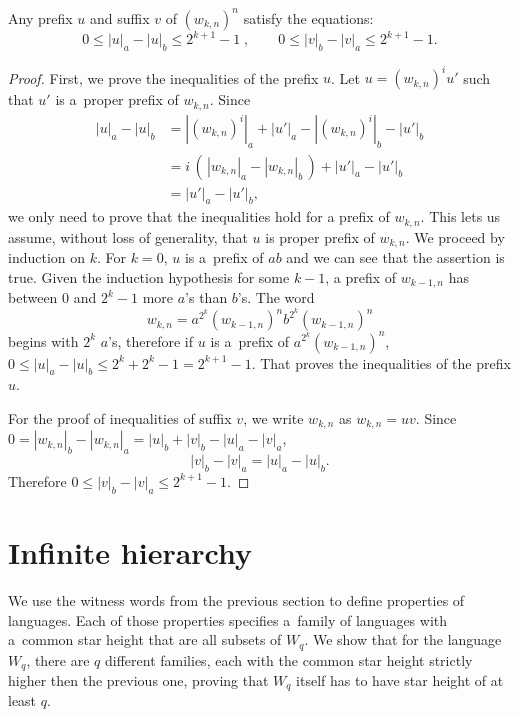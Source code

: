 \begin{lemma}\label{lm:witness_words_inequalities}
    Any prefix $u$ and suffix $v$ of ${(w_{k,n})}^n$ satisfy the equations:
    \[
        0 \leq |u|_a - |u|_b \leq 2^{k+1}-1 \; , \qquad 0 \leq |v|_b - |v|_a \leq 2^{k+1}-1.
    \]
\end{lemma}

\begin{proof}
    First, we prove the inequalities of the prefix $u$. Let $u = {(w_{k,n})}^i u'$ such that $u'$ is a~proper prefix of $w_{k,n}$. Since
    \begin{align*}
        |u|_a - |u|_b &= |{(w_{k,n})}^i|_a + |u'|_a - |{(w_{k,n})}^i|_b - |u'|_b \\
        &= i \, ( \, |w_{k,n}|_a - |w_{k,n}|_b \, ) + |u'|_a - |u'|_b \\
        &= |u'|_a - |u'|_b,
    \end{align*}
    we only need to prove that the inequalities hold for a prefix of $w_{k,n}$. This lets us assume, without loss of generality, that $u$ is proper prefix of $w_{k,n}$. We proceed by induction on $k$. For $k = 0$, $u$ is a~prefix of $ab$ and we can see that the assertion is true. Given the induction hypothesis for some $k - 1$, a prefix of $w_{k-1,n}$ has between $0$ and $2^k-1$ more $a$'s than $b$'s. The word
    \[
        w_{k,n} = a^{2^k} {(w_{k-1,n})}^n b^{2^k} {(w_{k-1,n})}^n
    \]
    begins with $2^k$ $a$'s, therefore if $u$ is a~prefix of $a^{2^k} {(w_{k-1,n})}^n$, $0 \leq |u|_a - |u|_b \leq 2^k+2^k-1 = 2^{k+1}-1$. That proves the inequalities of the prefix $u$.

    For the proof of inequalities of suffix $v$, we write $w_{k,n}$ as $w_{k,n} = uv$. Since $0 = |w_{k,n}|_b - |w_{k,n}|_a = |u|_b + |v|_b - |u|_a - |v|_a$,
    \[
        |v|_b - |v|_a = |u|_a - |u|_b.
    \]
    Therefore $0 \leq |v|_b - |v|_a \leq 2^{k+1}-1$.
\end{proof}

\section{Infinite hierarchy}

We use the witness words from the previous section to define properties of languages. Each of those properties specifies a~family of languages with a~common star height that are all subsets of $W_q$. We show that for the language $W_q$, there are $q$ different families, each with the common star height strictly higher then the previous one, proving that $W_q$ itself has to have star height of at least $q$.

